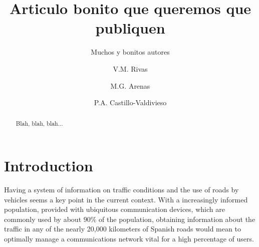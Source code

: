 \documentclass[preprint,authoryear,12pt]{elsarticle}
\begin{document}
\begin{frontmatter}



\title{Articulo bonito que queremos que publiquen}

\author{Muchos y bonitos autores}
\author[uja]{V.M. Rivas}
\author[ugr]{M.G. Arenas}
\author[ugr]{P.A. Castillo-Valdivieso}
\address[uja]{Department of Computer Sciences, University of Jaen (Spain)}
\address[ugr]{Department of Architecture and Computer Technology. CITIC. University of Granada (Spain)}


\address{}

\begin{abstract}
Blah, blah, blah...
\end{abstract}

\begin{keyword}


\end{keyword}

\end{frontmatter}


\section{Introduction}
\label{sec:introduction}
Having a system of information on traffic conditions and the use of roads by vehicles seems a key point in the current context. 
With a increasingly informed population, provided with ubiquitous communication devices, which are commonly used by about $ 90 \% $ of the population, obtaining information about the traffic in any of the nearly 20,000 kilometers of Spanish roads would mean to optimally manage a communications network vital for a high percentage of users.
\end{document}

